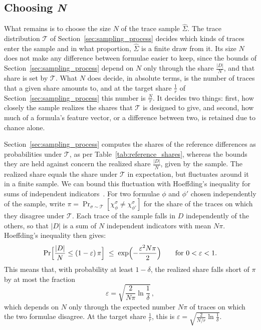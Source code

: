 \documentclass[titlepage,a4paper,11pt]{report}
\begin{document}
    \subsection{Choosing \textit{N}}\label{sec:choosing_n}
    What remains is to choose the size $N$ of the trace sample $\widehat \Sigma$. The trace distribution $\mathcal T$ of Section~\ref{sec:sampling_process} decides which kinds of traces enter the sample and in what proportion, $\widehat\Sigma$ is a finite draw from it. Its size $N$ does not make any difference between formulae easier to keep, since the bounds of Section~\ref{sec:sampling_process} depend on $N$ only through the share $\frac{|D|}{N}$, and that share is set by $\mathcal T$. What $N$ does decide, in absolute terms, is the number of traces that a given share amounts to, and at the target share $\frac1r$ of Section~\ref{sec:sampling_process} this number is $\frac{N}{r}$. It decides two things: first, how closely the sample realizes the shares that $\mathcal T$ is designed to give, and second, how much of a formula's feature vector, or a difference between two, is retained due to chance alone.

    Section~\ref{sec:sampling_process} computes the shares of the reference differences as probabilities under $\mathcal T$, as per Table~\ref{tab:reference_shares}, whereas the bounds they are held against concern the realized share $\frac{|D|}{N}$, given by the sample. The realized share equals the share under $\mathcal T$ in expectation, but fluctuates around it in a finite sample. We can bound this fluctuation with Hoeffding's inequality for sums of independent indicators~\citep{hoeffding_probability_1963}. For two formulae $\phi$ and $\phi'$ chosen independently of the sample, write $\pi=\Pr_{\sigma\sim\mathcal T}[\chi^\sigma_\phi\neq\chi^\sigma_{\phi'}]$ for the share of the traces on which they disagree under $\mathcal T$. Each trace of the sample falls in $D$ independently of the others, so that $|D|$ is a sum of $N$ independent indicators with mean $N\pi$. Hoeffding's inequality then gives:
    \begin{equation}\label{eq:share_shortfall}
        \Pr\Bigl[\frac{|D|}{N}\le(1-\varepsilon)\,\pi\Bigr]\;\le\;\exp\Bigl(-\frac{\varepsilon^2N\pi}{2}\Bigr)\qquad\text{for } 0<\varepsilon<1 .
    \end{equation}
    This means that, with probability at least $1-\delta$, the realized share falls short of $\pi$ by at most the fraction
    \begin{equation}\label{eq:share_tolerance}
        \varepsilon=\sqrt{\frac{2}{N\pi}\ln\frac1\delta}\,,
    \end{equation}
    which depends on $N$ only through the expected number $N\pi$ of traces on which the two formulae disagree. At the target share $\frac1r$, this is $\varepsilon=\sqrt{\frac{2}{N/r}\ln\frac1\delta}$.
    
\end{document}

